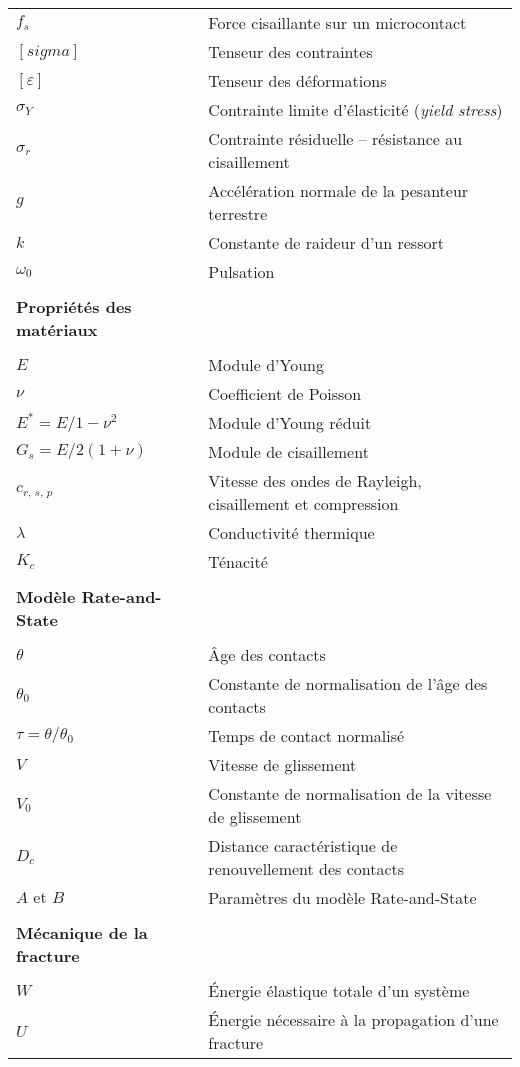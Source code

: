 \begin{tabularx}{\textwidth}{lX}
$f_s$ & Force cisaillante sur un microcontact\\
$[sigma]$ & Tenseur des contraintes\\
$[\varepsilon]$ & Tenseur des déformations\\
$\sigma_Y$ & Contrainte limite d'élasticité (\textit{yield stress})\\
$\sigma_r$ & Contrainte résiduelle -- résistance au cisaillement\\
$g$ & Accélération normale de la pesanteur terrestre\\
$k$ & Constante de raideur d'un ressort\\
$\omega_0$ & Pulsation\\
%
%
\\
\textbf{Propriétés des matériaux }\\
\\
$E$ & Module d'Young\\
$\nu$ & Coefficient de Poisson\\
$E^*={E}/{1-\nu^2}$ & Module d'Young réduit\\
$G_s={E}/{2(1+\nu)}$ & Module de cisaillement\\
$c_{r,\,s,\,p}$ & Vitesse des ondes de Rayleigh, cisaillement et compression\\
$\lambda$ & Conductivité thermique\\
$K_c$ & Ténacité\\
%
%
\\
\textbf{Modèle Rate-and-State }\\
\\
$\theta$ & Âge des contacts\\
$\theta_0$ & Constante de normalisation de l'âge des contacts\\
$\tau=\theta/\theta_0$ & Temps de contact normalisé\\
$V$ & Vitesse de glissement\\
$V_0$ & Constante de normalisation de la vitesse de glissement\\
$D_c$ & Distance caractéristique de renouvellement des contacts\\
$A\text{ et }B$ & Paramètres du modèle Rate-and-State\\
%
%
\\
\textbf{Mécanique de la fracture }\\
\\
$W$ & Énergie élastique totale d'un système\\
$U$ & Énergie nécessaire à la propagation d'une fracture\\

\end{tabularx}
